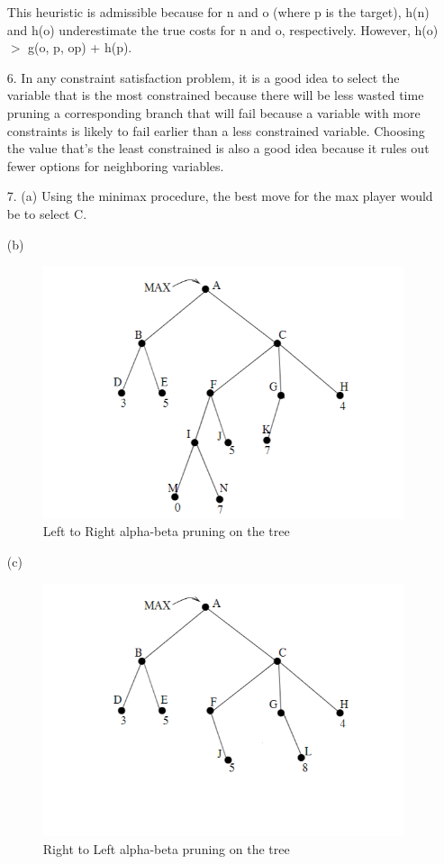 \documentclass{article}
\begin{document}
\begin{enumerate}
This heuristic is admissible because for n and o (where p is the target), h(n) and h(o) underestimate the true costs for n and o, respectively.  However, h(o) $>$ g(o, p, op) + h(p).

\item[6.] In any constraint satisfaction problem, it is a good idea to select the variable that is the most constrained because there will be less wasted time pruning a corresponding branch that will fail because a variable with more constraints is likely to fail earlier than a less constrained variable.  Choosing the value that's the least constrained is also a good idea because it rules out fewer options for neighboring variables. 

\item[7.] 
(a) Using the minimax procedure, the best move for the max player would be to select C. 

(b) \begin{figure}[h]
    \centering
    \includegraphics[width=.4\linewidth]{AI2 P7 b.png}
    \caption{Left to Right alpha-beta pruning on the tree}
    \label{bidirectional}
\end{figure}

(c)\begin{figure}[h]
    \centering
    \includegraphics[width=.4\linewidth]{AI2 P7 c.png}
    \caption{Right to Left alpha-beta pruning on the tree}
    \label{bidirectional}
\end{figure}
\end{enumerate}
\end{document}
